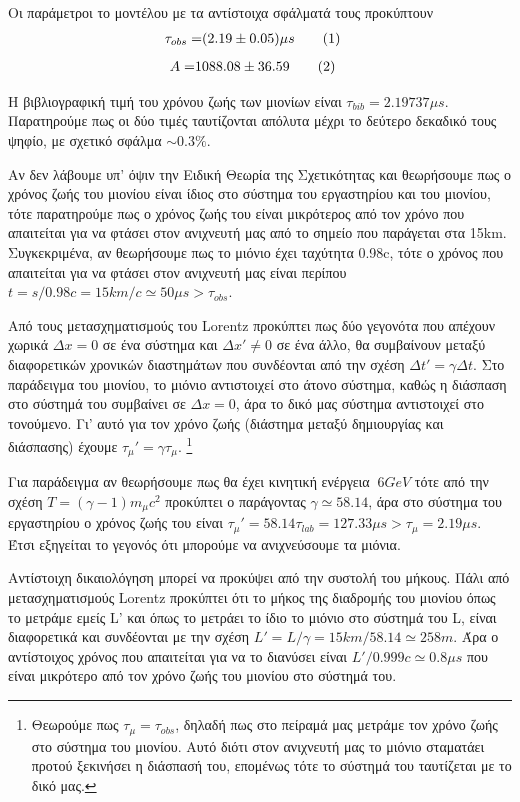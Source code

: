 \documentclass[a4paper]{book}
\newcommand\numberthis{\addtocounter{equation}{1}\tag{\theequation}}
\begin{document}
Οι παράμετροι το μοντέλου με τα αντίστοιχα σφάλματά τους προκύπτουν 
	\begin{align*}\label{eq13}
		\tau_{obs} =& (2.19   \pm 0.05  )\mu s  \numberthis
	\end{align*}
\vspace{-0.5cm}
	\begin{align*}\label{eq14}
		A    =& 1088.08 \pm 36.59           \numberthis
	\end{align*}

Η βιβλιογραφική τιμή του χρόνου ζωής των μιονίων είναι $\tau_{bib} = 2.19737\mu s$.
	Παρατηρούμε πως οι δύο τιμές ταυτίζονται απόλυτα μέχρι το δεύτερο δεκαδικό τους ψηφίο, με σχετικό σφάλμα $\sim0.3\%$.
	
	Αν δεν λάβουμε υπ' όψιν την Ειδική Θεωρία της Σχετικότητας και θεωρήσουμε πως ο χρόνος ζωής του μιονίου είναι ίδιος στο σύστημα του εργαστηρίου και του μιονίου, τότε παρατηρούμε πως ο χρόνος ζωής του είναι μικρότερος από τον χρόνο που απαιτείται για να φτάσει στον ανιχνευτή μας από το σημείο που παράγεται στα 15km.
	Συγκεκριμένα, αν θεωρήσουμε πως το μιόνιο έχει ταχύτητα 0.98c, τότε ο χρόνος που απαιτείται για να φτάσει στον ανιχνευτή μας είναι περίπου $t=s/0.98c=15km/c\simeq50\mu s >\tau_{obs}$.
	
	Από τους μετασχηματισμούς του Lorentz προκύπτει πως δύο γεγονότα που απέχουν  χωρικά $\Delta x=0$ σε ένα σύστημα και $\Delta x'\neq0$ σε ένα άλλο, θα συμβαίνουν μεταξύ διαφορετικών χρονικών διαστημάτων που συνδέονται από την σχέση $\Delta t' = \gamma \Delta t$.
	Στο παράδειγμα του μιονίου, το μιόνιο αντιστοιχεί στο άτονο σύστημα, καθώς η διάσπαση στο σύστημά του συμβαίνει σε $\Delta x = 0$, άρα το δικό μας σύστημα αντιστοιχεί στο τονούμενο.
	Γι' αυτό για τον χρόνο ζωής (διάστημα μεταξύ δημιουργίας και διάσπασης) έχουμε 
	$\tau_{\mu}' = \gamma \tau_{\mu}$.
	\footnote{Θεωρούμε πως $\tau_{\mu} = \tau_{obs}$, δηλαδή πως στο πείραμά μας μετράμε τον χρόνο ζωής στο σύστημα του μιονίου. Αυτό διότι στον ανιχνευτή μας το μιόνιο σταματάει προτού ξεκινήσει η διάσπασή του, επομένως τότε το σύστημά του ταυτίζεται με το δικό μας.} 
	
		Για παράδειγμα αν θεωρήσουμε πως θα έχει κινητική ενέργεια $~6GeV$ τότε από την σχέση $T=(\gamma-1)m_\mu c^2$ προκύπτει ο παράγοντας $\gamma\simeq58.14$, άρα στο σύστημα του εργαστηρίου ο χρόνος ζωής του είναι $\tau_\mu' = 58.14\tau_{lab} =  127.33\mu s > \tau_\mu= 2.19\mu s$. Έτσι εξηγείται το γεγονός ότι μπορούμε να ανιχνεύσουμε τα μιόνια.
		
		Αντίστοιχη δικαιολόγηση μπορεί να προκύψει από την συστολή του μήκους.
	Πάλι από μετασχηματισμούς Lorentz προκύπτει ότι το μήκος της διαδρομής του μιονίου όπως το μετράμε εμείς L' και όπως το μετράει το ίδιο το μιόνιο στο σύστημά του L, είναι διαφορετικά και συνδέονται με την σχέση 
	$L' = L/\gamma=15km/58.14 \simeq 258m$. 
	Άρα ο αντίστοιχος χρόνος που απαιτείται για να το διανύσει είναι $L'/0.999c\simeq 0.8\mu s$ που είναι μικρότερο από τον χρόνο ζωής του μιονίου στο σύστημά του.
	
\end{document}
